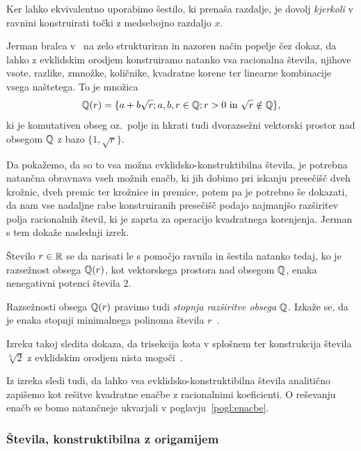\begin{opomba}
    Ker lahko ekvivalentno uporabimo šestilo, ki prenaša razdalje, je dovolj \emph{kjerkoli} v ravnini konstruirati točki z medsebojno razdaljo $x$.
\end{opomba}

Jerman bralca v~\cite{jerman1998} na zelo strukturiran in nazoren način popelje čez dokaz, da lahko z evklidskim orodjem konstruiramo natanko vsa racionalna števila, njihove vsote, razlike, zmnožke, količnike, kvadratne korene ter linearne kombinacije vsega naštetega. To je množica
$$
    \mathbb Q(r) = \{ a + b \sqrt{r}; a, b, r \in \mathbb Q; r > 0 \text{ in } \sqrt{r} \notin \mathbb Q \},
$$
ki je komutativen obseg oz.\ polje in hkrati tudi dvorazsežni vektorski prostor nad obsegom $\mathbb Q$ z bazo $ \{1, \sqrt{r} \} $.

Da pokažemo, da so to vsa možna evklidsko-konstruktibilna števila, je potrebna natančna obravnava vseh možnih enačb, ki jih dobimo pri iskanju presečišč dveh krožnic, dveh premic ter krožnice in premice, potem pa je potrebno še dokazati, da nam vse nadaljne rabe konstruiranih presečišč podajo najmanjšo razširitev polja racionalnih števil, ki je zaprta za operacijo kvadratnega korenjenja. Jerman s tem dokaže naslednji izrek.

\begin{izrek}
    \label{izr:evkl_konstr}
    Število $r \in \mathbb R$ se da narisati le s pomočjo ravnila in šestila natanko tedaj, ko je razsežnost obsega $\mathbb Q(r)$, kot vektorskega prostora nad obsegom $\mathbb Q$, enaka nenegativni potenci števila $2$.
\end{izrek}

\begin{opomba}
    \label{op:razseznost_obsega_evkl}
    Razsežnosti obsega $\mathbb Q(r)$ pravimo tudi \emph{stopnja razširitve obsega $\mathbb Q$}. Izkaže se, da je enaka stopnji minimalnega polinoma števila $r$~\cite[str.\ 77]{jerman1998}.
\end{opomba}

Izreku takoj sledita dokaza, da trisekcija kota v splošnem ter konstrukcija števila $ \sqrt[3]{2} $ z evklidskim orodjem nista mogoči~\cite[str.\ 77--78]{jerman1998}.

Iz izreka sledi tudi, da lahko vsa evklidsko-konstruktibilna števila analitično zapišemo kot rešitve kvadratne enačbe z racionalnimi koeficienti. O reševanju enačb se bomo natančneje ukvarjali v poglavju~\ref{pogl:enacbe}.

\subsubsection{Števila, konstruktibilna z origamijem}
\label{origami_konstruktibilnost}

